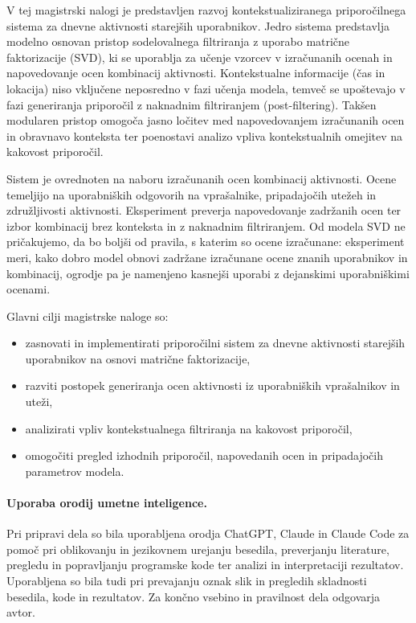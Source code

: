 \documentclass[a4paper,twoside,openright,12pt,slovene]{book}
\begin{document}
V tej magistrski nalogi je predstavljen razvoj kontekstualiziranega
priporočilnega sistema za dnevne aktivnosti starejših uporabnikov. Jedro
sistema predstavlja modelno osnovan pristop sodelovalnega filtriranja z
uporabo matrične faktorizacije (SVD), ki se uporablja za učenje vzorcev v izračunanih ocenah in napovedovanje ocen kombinacij aktivnosti. Kontekstualne informacije
(čas in lokacija) niso vključene neposredno v fazi učenja modela, temveč se
upoštevajo v fazi generiranja priporočil z naknadnim filtriranjem
(post-filtering). Takšen modularen pristop omogoča jasno ločitev med
napovedovanjem izračunanih ocen in obravnavo konteksta ter poenostavi analizo vpliva
kontekstualnih omejitev na kakovost priporočil.

Sistem je ovrednoten na naboru izračunanih ocen kombinacij
aktivnosti. Ocene temeljijo na uporabniških odgovorih na
vprašalnike, pripadajočih utežeh in združljivosti aktivnosti.
Eksperiment preverja napovedovanje zadržanih ocen ter izbor
kombinacij brez konteksta in z naknadnim filtriranjem.
Od modela SVD ne pričakujemo, da bo boljši od pravila, s katerim so
ocene izračunane: eksperiment meri, kako dobro model obnovi zadržane
izračunane ocene znanih uporabnikov in kombinacij, ogrodje pa je
namenjeno kasnejši uporabi z dejanskimi uporabniškimi ocenami.

Glavni cilji magistrske naloge so:
\begin{itemize}
    \item zasnovati in implementirati priporočilni sistem za dnevne aktivnosti
    starejših uporabnikov na osnovi matrične faktorizacije,
    \item razviti postopek generiranja ocen aktivnosti iz uporabniških
    vprašalnikov in uteži,
    \item analizirati vpliv kontekstualnega filtriranja na kakovost
    priporočil,
    \item omogočiti pregled izhodnih priporočil, napovedanih ocen
in pripadajočih parametrov modela.
\end{itemize}

\paragraph{Uporaba orodij umetne inteligence.}
Pri pripravi dela so bila uporabljena orodja ChatGPT,
Claude in Claude Code za pomoč pri oblikovanju in
jezikovnem urejanju besedila, preverjanju literature,
pregledu in popravljanju programske kode ter analizi
in interpretaciji rezultatov. Uporabljena so bila tudi
pri prevajanju oznak slik in pregledih skladnosti
besedila, kode in rezultatov.
Za končno vsebino in pravilnost dela odgovarja avtor.
\end{document}
